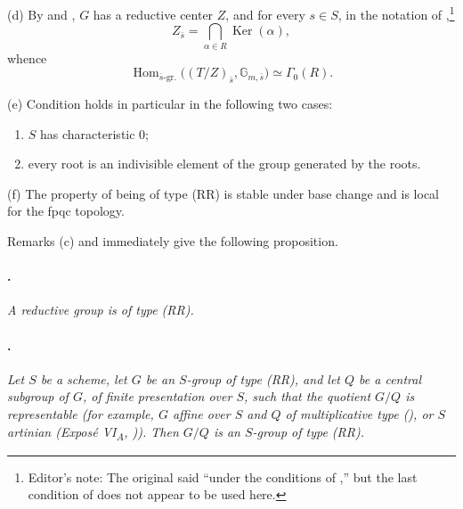 \textup{(d)} By  \textup{} and \textup{},
\(G\) has a reductive center \(Z\), and for every \(s\in S\), in
the notation of \textup{},\footnote{Editor's note: The original
said ``under the conditions of \textup{},'' but the last
condition of \textup{} does not appear to be used here.}
\[
  Z_{\bar s}
  =
  \bigcap_{\alpha\in R}\operatorname{Ker}(\alpha),
\]
whence
\[
  \operatorname{Hom}_{\bar s\text{-gr.}}
    \bigl((T/Z)_{\bar s},\mathbb G_{m,\bar s}\bigr)
  \simeq
  \Gamma_0(R).
\]

\textup{(e)} Condition \textup{} holds in particular in the
following two cases:
\begin{enumerate}
\item[\textup{(1)}]
\(S\) has characteristic \(0\);

\item[\textup{(2)}]
every root is an indivisible element of the group generated by the
roots.
\end{enumerate}

\textup{(f)} The property of being of type \textup{(RR)} is stable
under base change and is local for the fpqc topology.

Remarks \textup{(c)} and \textup{} immediately give the
following proposition.

\paragraph{.}
\textit{A reductive group is of type \textup{(RR)}.}

\paragraph{.}
\textit{Let \(S\) be a scheme, let \(G\) be an \(S\)-group of type
\textup{(RR)}, and let \(Q\) be a central subgroup of \(G\), of
finite presentation over \(S\), such that the quotient \(G/Q\) is
representable \textup{(for example, \(G\) affine over \(S\) and
\(Q\) of multiplicative type \textup{()}, or \(S\)
artinian \textup{(Exposé VI\textsubscript{A}, )})}. Then
\(G/Q\) is an \(S\)-group of type \textup{(RR)}.}

